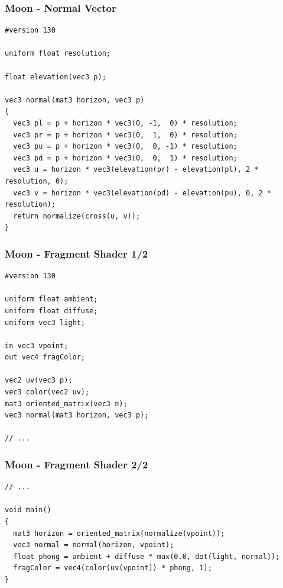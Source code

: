 \documentclass[aspectratio=169,11pt,xcolor=dvipsnames]{beamer}
\begin{document}
\begin{frame}[fragile]
  \frametitle{Moon {-} Normal Vector}
  \begin{verbatim}
#version 130

uniform float resolution;

float elevation(vec3 p);

vec3 normal(mat3 horizon, vec3 p)
{
  vec3 pl = p + horizon * vec3(0, -1,  0) * resolution;
  vec3 pr = p + horizon * vec3(0,  1,  0) * resolution;
  vec3 pu = p + horizon * vec3(0,  0, -1) * resolution;
  vec3 pd = p + horizon * vec3(0,  0,  1) * resolution;
  vec3 u = horizon * vec3(elevation(pr) - elevation(pl), 2 * resolution, 0);
  vec3 v = horizon * vec3(elevation(pd) - elevation(pu), 0, 2 * resolution);
  return normalize(cross(u, v));
}
  \end{verbatim}
\end{frame}

\begin{frame}[fragile]
  \frametitle{Moon {-} Fragment Shader 1/2}
  \begin{verbatim}
#version 130

uniform float ambient;
uniform float diffuse;
uniform vec3 light;

in vec3 vpoint;
out vec4 fragColor;

vec2 uv(vec3 p);
vec3 color(vec2 uv);
mat3 oriented_matrix(vec3 n);
vec3 normal(mat3 horizon, vec3 p);

// ...
  \end{verbatim}
\end{frame}

\begin{frame}[fragile]
  \frametitle{Moon {-} Fragment Shader 2/2}
  \begin{verbatim}
// ...

void main()
{
  mat3 horizon = oriented_matrix(normalize(vpoint));
  vec3 normal = normal(horizon, vpoint);
  float phong = ambient + diffuse * max(0.0, dot(light, normal));
  fragColor = vec4(color(uv(vpoint)) * phong, 1);
}
  \end{verbatim}
\end{frame}
\end{document}
